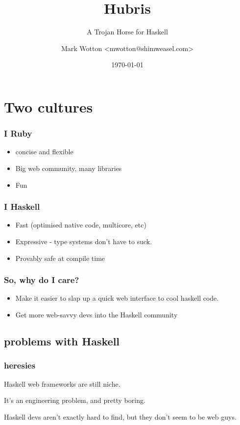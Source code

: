 \documentclass{beamer}
\title{Hubris}
\subtitle{A Trojan Horse for Haskell}
\author{Mark Wotton \textless mwotton@shimweasel.com\textgreater}
\date{\today}
\begin{document}
\lstset{language=Haskell}
\section{Two cultures}
\frame{\titlepage}

\begin{frame}
  \frametitle{I  Ruby}
  \begin{itemize}
  \item concise and flexible
  \item Big web community, many libraries
  \item Fun
  \end{itemize}
\end{frame}

\begin{frame} 
  \frametitle{I  Haskell}
  \begin{itemize}
  \item<1-> Fast (optimised native code, multicore, etc)
  \item<2-> Expressive - type systems don't have to suck.
  \item<3-> Provably safe at compile time
  \end{itemize}
\end{frame}


\begin{frame}
  \frametitle{So, why do I care?}
  \begin{itemize}
  \item<1-> Make it easier to slap up a quick web interface to cool
    haskell code.
  \item<2-> Get more web-savvy devs into the Haskell community
  \end{itemize}
\end{frame}

\subsection{problems with Haskell}
\begin{frame}
\frametitle{heresies}
\setlength\parskip{0.1in}

Haskell web frameworks are still niche.

It's an engineering problem, and pretty boring.

Haskell devs aren't exactly hard to find, but they don't seem to be
web guys.

\end{frame}
\end{document}
